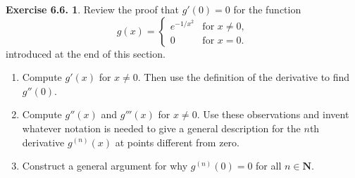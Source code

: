 \documentclass[12pt]{article}
\theoremstyle{definition}
\theoremstyle{exercise}
\newtheorem{exercise}{Exercise 6.6.}
\theoremstyle{solution}
\newcommand{\N}{\mathbf{N}}
\begin{document}
\begin{exercise}
\label{ex:6}
    Review the proof that \( g'(0) = 0 \) for the function
    \[
        g(x) = \begin{cases}
            e^{-1/x^2} & \text{for } x \neq 0, \\
            0 & \text{for } x = 0.
        \end{cases}
    \]
    introduced at the end of this section.
    \begin{enumerate}
        \item Compute \( g'(x) \) for \( x \neq 0 \). Then use the definition of the derivative to find \( g''(0) \).

        \item Compute \( g''(x) \) and \( g'''(x) \) for \( x \neq 0 \). Use these observations and invent whatever notation is needed to give a general description for the \( n \)th derivative \( g^{(n)}(x) \) at points different from zero.

        \item Construct a general argument for why \( g^{(n)}(0) = 0 \) for all \( n \in \N \).
    \end{enumerate}
\end{exercise}
\end{document}
